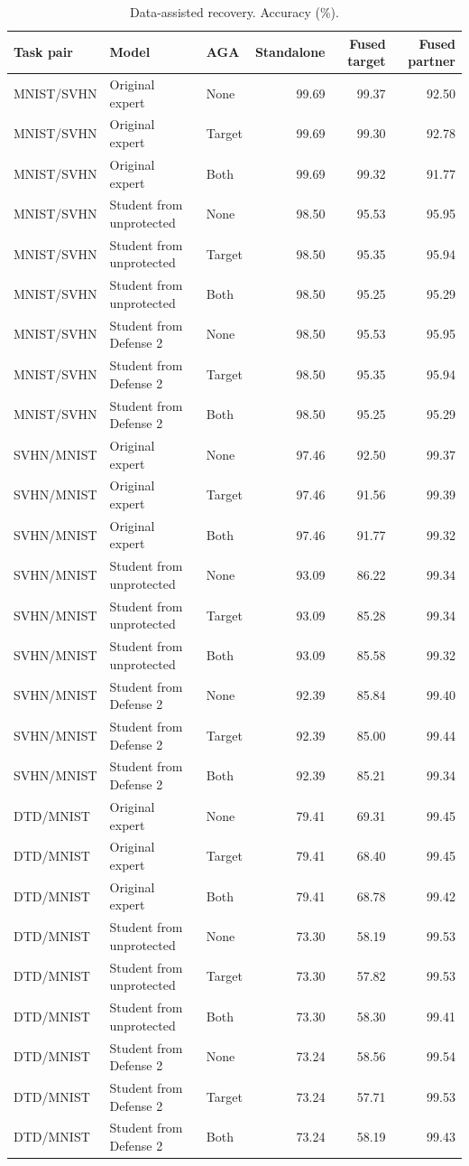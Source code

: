 \begin{table}[t]
\centering\small
\caption{Data-assisted recovery. Accuracy (\%).}
\begin{tabular}{lllrrr}
\toprule
Task pair & Model & AGA & Standalone & Fused target & Fused partner \\
\midrule
MNIST/SVHN & Original expert & None & 99.69 & 99.37 & 92.50 \\
MNIST/SVHN & Original expert & Target & 99.69 & 99.30 & 92.78 \\
MNIST/SVHN & Original expert & Both & 99.69 & 99.32 & 91.77 \\
MNIST/SVHN & Student from unprotected & None & 98.50 & 95.53 & 95.95 \\
MNIST/SVHN & Student from unprotected & Target & 98.50 & 95.35 & 95.94 \\
MNIST/SVHN & Student from unprotected & Both & 98.50 & 95.25 & 95.29 \\
MNIST/SVHN & Student from Defense 2 & None & 98.50 & 95.53 & 95.95 \\
MNIST/SVHN & Student from Defense 2 & Target & 98.50 & 95.35 & 95.94 \\
MNIST/SVHN & Student from Defense 2 & Both & 98.50 & 95.25 & 95.29 \\
SVHN/MNIST & Original expert & None & 97.46 & 92.50 & 99.37 \\
SVHN/MNIST & Original expert & Target & 97.46 & 91.56 & 99.39 \\
SVHN/MNIST & Original expert & Both & 97.46 & 91.77 & 99.32 \\
SVHN/MNIST & Student from unprotected & None & 93.09 & 86.22 & 99.34 \\
SVHN/MNIST & Student from unprotected & Target & 93.09 & 85.28 & 99.34 \\
SVHN/MNIST & Student from unprotected & Both & 93.09 & 85.58 & 99.32 \\
SVHN/MNIST & Student from Defense 2 & None & 92.39 & 85.84 & 99.40 \\
SVHN/MNIST & Student from Defense 2 & Target & 92.39 & 85.00 & 99.44 \\
SVHN/MNIST & Student from Defense 2 & Both & 92.39 & 85.21 & 99.34 \\
DTD/MNIST & Original expert & None & 79.41 & 69.31 & 99.45 \\
DTD/MNIST & Original expert & Target & 79.41 & 68.40 & 99.45 \\
DTD/MNIST & Original expert & Both & 79.41 & 68.78 & 99.42 \\
DTD/MNIST & Student from unprotected & None & 73.30 & 58.19 & 99.53 \\
DTD/MNIST & Student from unprotected & Target & 73.30 & 57.82 & 99.53 \\
DTD/MNIST & Student from unprotected & Both & 73.30 & 58.30 & 99.41 \\
DTD/MNIST & Student from Defense 2 & None & 73.24 & 58.56 & 99.54 \\
DTD/MNIST & Student from Defense 2 & Target & 73.24 & 57.71 & 99.53 \\
DTD/MNIST & Student from Defense 2 & Both & 73.24 & 58.19 & 99.43 \\
\bottomrule
\end{tabular}
\end{table}

